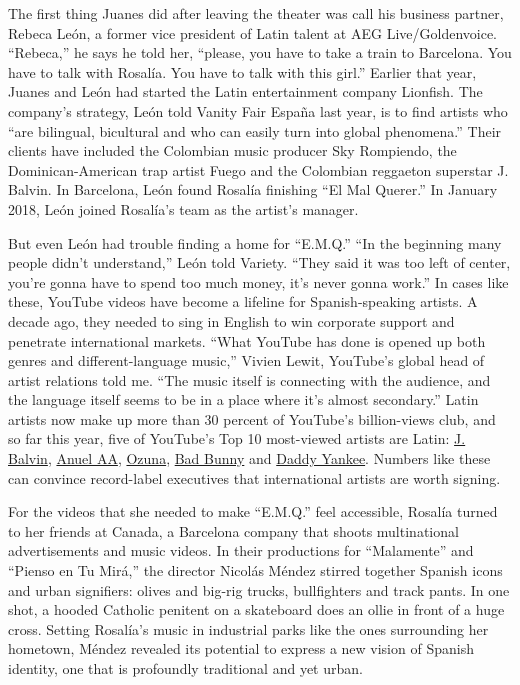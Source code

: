 The first thing Juanes did after leaving the theater was call his
business partner, Rebeca León, a former vice president of Latin talent
at AEG Live/Goldenvoice. ``Rebeca,'' he says he told her, ``please, you
have to take a train to Barcelona. You have to talk with Rosalía. You
have to talk with this girl.'' Earlier that year, Juanes and León had
started the Latin entertainment company Lionfish. The company's
strategy, León told Vanity Fair España last year, is to find artists who
``are bilingual, bicultural and who can easily turn into global
phenomena.'' Their clients have included the Colombian music producer
Sky Rompiendo, the Dominican-American trap artist Fuego and the
Colombian reggaeton superstar J. Balvin. In Barcelona, León found
Rosalía finishing ``El Mal Querer.'' In January 2018, León joined
Rosalía's team as the artist's manager.

But even León had trouble finding a home for ``E.M.Q.'' ``In the
beginning many people didn't understand,'' León told Variety. ``They
said it was too left of center, you're gonna have to spend too much
money, it's never gonna work.'' In cases like these, YouTube videos have
become a lifeline for Spanish-speaking artists. A decade ago, they
needed to sing in English to win corporate support and penetrate
international markets. ``What YouTube has done is opened up both genres
and different-language music,'' Vivien Lewit, YouTube's global head of
artist relations told me. ``The music itself is connecting with the
audience, and the language itself seems to be in a place where it's
almost secondary.'' Latin artists now make up more than 30 percent of
YouTube's billion-views club, and so far this year, five of YouTube's
Top 10 most-viewed artists are Latin:
\href{https://www.youtube.com/channel/UCt-k6JwNWHMXDBGm9IYHdsg}{J.
Balvin},
\href{https://www.youtube.com/channel/UCRI7hheejBbWS6etTNwMT0g}{Anuel
AA},
\href{https://www.youtube.com/channel/UCjIA3wwhi0QjSOXAZwOXbPA}{Ozuna},
\href{https://www.youtube.com/channel/UCmBA_wu8xGg1OfOkfW13Q0Q}{Bad
Bunny} and
\href{https://www.youtube.com/user/DaddyYankeeOFFTV/videos}{Daddy
Yankee}. Numbers like these can convince record-label executives that
international artists are worth signing.

For the videos that she needed to make ``E.M.Q.'' feel accessible,
Rosalía turned to her friends at Canada, a Barcelona company that shoots
multinational advertisements and music videos. In their productions for
``Malamente'' and ``Pienso en Tu Mirá,'' the director Nicolás Méndez
stirred together Spanish icons and urban signifiers: olives and big-rig
trucks, bullfighters and track pants. In one shot, a hooded Catholic
penitent on a skateboard does an ollie in front of a huge cross. Setting
Rosalía's music in industrial parks like the ones surrounding her
hometown, Méndez revealed its potential to express a new vision of
Spanish identity, one that is profoundly traditional and yet urban.

